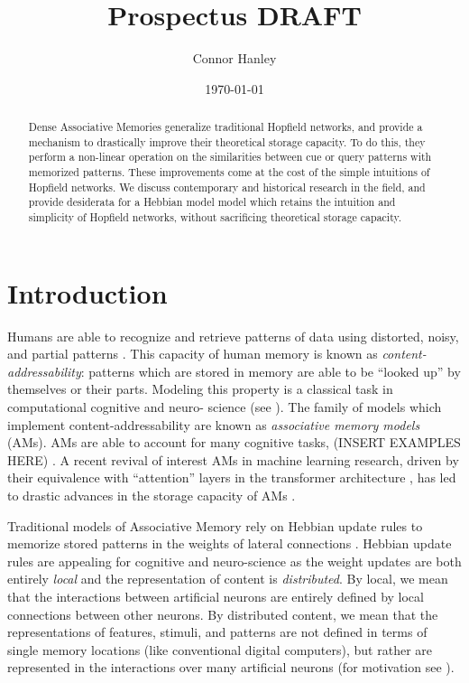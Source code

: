 \documentclass{article}
\title{Prospectus DRAFT}
\author{Connor Hanley}
\date{\today}
\theoremstyle{definition}
\begin{document}
\maketitle

\begin{abstract}
  Dense Associative Memories generalize traditional Hopfield networks, and
  provide a mechanism to drastically improve their theoretical storage
  capacity. To do this, they perform a non-linear operation on the
  similarities between cue or query patterns with memorized patterns. These
  improvements come at the cost of the simple intuitions of Hopfield networks.
  We discuss contemporary and historical research in the field, and provide
  desiderata for a Hebbian model model which retains the intuition and
  simplicity of Hopfield networks, without sacrificing theoretical storage
  capacity.
\end{abstract}

\section{Introduction}

Humans are able to recognize and retrieve patterns of data using distorted,
noisy, and partial patterns \parencite{rumelhart_general_1986}. This
capacity of human memory is known as \textit{content-addressability}: patterns
which are stored in memory are able to be ``looked up'' by themselves or their
parts. Modeling this property is a classical task in computational cognitive
and neuro- science (see \textcites{marr_simple_1971,little_existence_1974,
amari_learning_1972,nakano_associatron-model_1972,stanley_simulation_1976}).
The family of models which implement content-addressability are known
as \textit{associative memory models} (AMs). AMs are able to account for many
cognitive tasks, (INSERT EXAMPLES HERE) \parencite{hintzman_minerva_1984}.
A recent revival of interest AMs in machine learning research,
driven by their equivalence with ``attention'' layers in the transformer
architecture \parencites{vaswani_attention_2023, ramsauer_hopfield_2021},
has led to drastic advances in the storage capacity of AMs
\parencites{demircigil_model_2017,krotov_dense_2016,hu_provably_2024}.

Traditional models of Associative Memory rely on Hebbian update rules
to memorize stored patterns in the weights of lateral connections
\parencites{amari_learning_1972,hopfield_neural_1982,kohonen_correlation_1988,
nakano_associatron-model_1972,}. Hebbian update rules are appealing
for cognitive
and neuro-science as the weight updates are both entirely \textit{local} and
the representation of content is \textit{distributed}. By local, we mean
that the interactions between artificial neurons are entirely defined by
local connections between other neurons. By distributed content, we mean that
the representations of features, stimuli, and patterns are not defined in terms
of single memory locations (like conventional digital computers), but rather
are represented in the interactions over many artificial neurons (for motivation
see \textcite{mcclelland_appeal_1986}).
\end{document}
